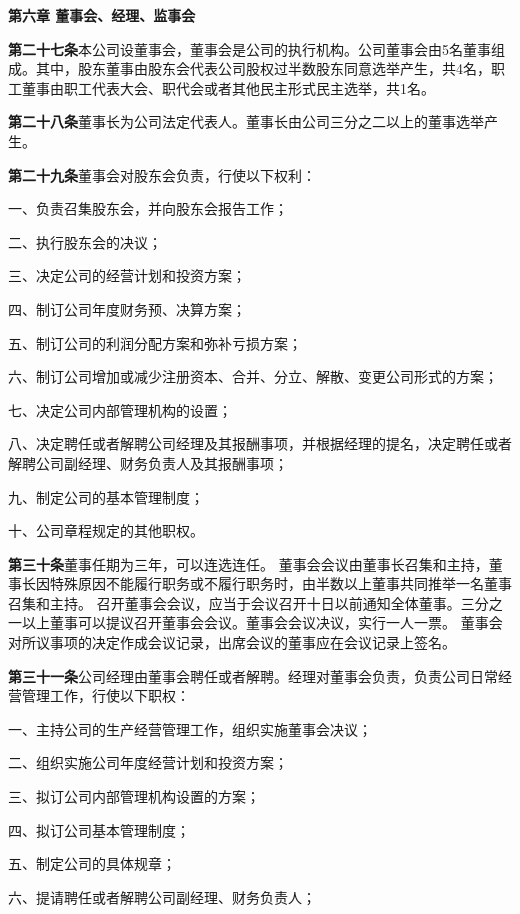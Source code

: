 \begin{center}
\textbf{第六章 \quad  董事会、经理、监事会}
\end{center}

\textbf{第二十七条}\quad 本公司设董事会，董事会是公司的执行机构。公司董事会由5名董事组成。其中，股东董事由股东会代表公司股权过半数股东同意选举产生，共4名，职工董事由职工代表大会、职代会或者其他民主形式民主选举，共1名。

\textbf{第二十八条}\quad 董事长为公司法定代表人。董事长由公司三分之二以上的董事选举产生。

\textbf{第二十九条}\quad 董事会对股东会负责，行使以下权利：

    一、负责召集股东会，并向股东会报告工作；

    二、执行股东会的决议；

    三、决定公司的经营计划和投资方案；

四、制订公司年度财务预、决算方案；

五、制订公司的利润分配方案和弥补亏损方案；

    六、制订公司增加或减少注册资本、合并、分立、解散、变更公司形式的方案；

    七、决定公司内部管理机构的设置；

    八、决定聘任或者解聘公司经理及其报酬事项，并根据经理的提名，决定聘任或者解聘公司副经理、财务负责人及其报酬事项；

九、制定公司的基本管理制度；

十、公司章程规定的其他职权。

\textbf{第三十条}\quad 董事任期为三年，可以连选连任。
     董事会会议由董事长召集和主持，董事长因特殊原因不能履行职务或不履行职务时，由半数以上董事共同推举一名董事召集和主持。
     召开董事会会议，应当于会议召开十日以前通知全体董事。三分之一以上董事可以提议召开董事会会议。董事会会议决议，实行一人一票。
     董事会对所议事项的决定作成会议记录，出席会议的董事应在会议记录上签名。

\textbf{第三十一条}\quad 公司经理由董事会聘任或者解聘。经理对董事会负责，负责公司日常经营管理工作，行使以下职权：

    一、主持公司的生产经营管理工作，组织实施董事会决议；

    二、组织实施公司年度经营计划和投资方案；

    三、拟订公司内部管理机构设置的方案；

    四、拟订公司基本管理制度；

    五、制定公司的具体规章；

    六、提请聘任或者解聘公司副经理、财务负责人；

